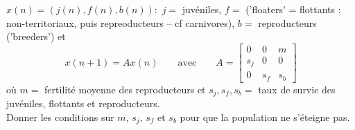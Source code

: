 \begin{exercise*}
  $x(n) = (j(n), f(n), b(n)) :$ $j =$ juvéniles, $f = $ ('floaters' = flottants : non-territoriaux, puis repreoducteurs -- cf carnivores), $b = $ reproducteurs ('breeders') et
  $$
  x(n+1) = A x(n) 
  \qquad \text{avec} \qquad
  A = \left[\begin{array}{ccc} 0 & 0 & m \\ s_j & 0 & 0 \\ 0 & s_f & s_b \end{array}\right]
  $$
  où $m =$ fertilité moyenne des reproducteurs et $s_j, s_f, s_b =$ taux de survie des juvéniles, flottants et reproducteurs. \\
  Donner les conditions sur $m$, $s_j$, $s_f$ et $s_b$ pour que la population ne s'éteigne pas.
\end{exercise*}

